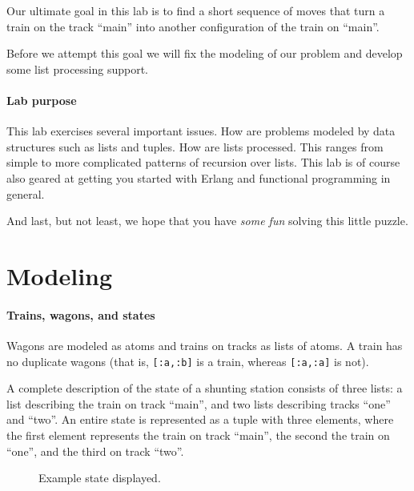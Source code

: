 \documentclass[a4paper,11pt]{article}
\begin{document}
Our ultimate goal in this lab is to find a short sequence
of moves that turn a train on the track ``main'' into another
configuration of the train on ``main''.


Before we attempt this goal we will fix the modeling of our
problem and develop some list processing support.

\paragraph{Lab purpose}

This lab exercises several important issues.  How are problems modeled
by data structures such as lists and tuples.  How are lists
processed. This ranges from simple to more complicated patterns of
recursion over lists. This lab is of course also geared at getting you
started with Erlang and functional programming in general.

And last, but not least, we hope that you have \emph{some fun} solving
this little puzzle.

\section{Modeling}

\paragraph{Trains, wagons, and states}

Wagons are modeled as atoms and trains on tracks as lists of atoms. A
train has no duplicate wagons (that is, \verb+[:a,:b]+ is a train,
whereas \verb+[:a,:a]+ is not).

A complete description of the state of a shunting station
consists of three lists: a list describing the train on track
``main'', and two lists describing tracks ``one'' and ``two''. An
entire state is represented as a tuple with three elements, where
the first element represents the train on track ``main'', the
second the train on ``one'', and the third on track ``two''.

\begin{figure}[h]
\begin{center}
\end{center}
\caption{Example state displayed.}
\label{fig:ex-state}
\end{figure}
\end{document}
